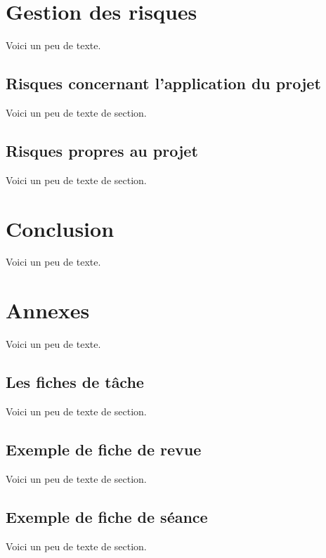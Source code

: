     \chapter{Gestion des risques}
    Voici un peu de texte.
    \section{Risques concernant l'application du projet}
    Voici un peu de texte de section.
    \section{Risques propres au projet}
    Voici un peu de texte de section.
    
    \chapter{Conclusion}
    Voici un peu de texte.
    
    \chapter{Annexes}
    Voici un peu de texte.
    \section{Les fiches de tâche}
    Voici un peu de texte de section.
    \section{Exemple de fiche de revue}
    Voici un peu de texte de section.
    \section{Exemple de fiche de séance}
    Voici un peu de texte de section.



